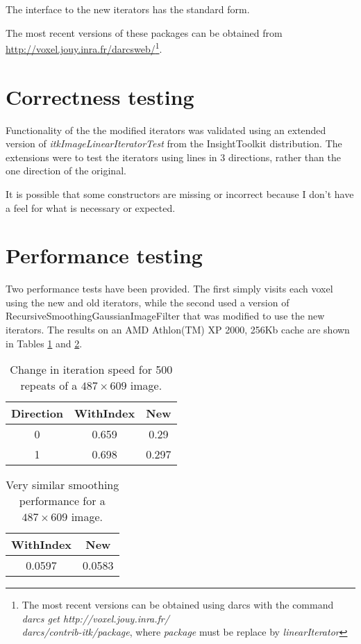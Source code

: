 \documentclass{InsightArticle}
\begin{document}
The interface to the new iterators has the standard form.

The most recent versions of these packages can be
obtained from \url{http://voxel.jouy.inra.fr/darcsweb/}\footnote{
The most recent versions can be obtained using darcs \cite{DarcsWebSite}
with the command {\em darcs get http://voxel.jouy.inra.fr/\\darcs/contrib-itk/package},
where {\em package} must be replace by {\em linearIterator}}.

\section{Correctness testing}
Functionality of the the modified iterators was validated using an
extended version of {\em itkImageLinearIteratorTest} from the
InsightToolkit distribution. The extensions were to test the iterators
using lines in 3 directions, rather than the one direction of the
original.

It is possible that some constructors are missing or incorrect because
I don't have a feel for what is necessary or expected.

\section{Performance testing}
Two performance tests have been provided. The first simply visits each
voxel using the new and old iterators, while the second used a version
of RecursiveSmoothingGaussianImageFilter that was modified to use the
new iterators. The results on an AMD Athlon(TM) XP 2000, 256Kb cache are shown in Tables \ref{tab:iterationPerf} and \ref{tab:smoothingPerf}.

\begin{table}[htbp]
\centering
\begin{tabular}{ccc}
\hline
Direction  &  WithIndex &  New \\
\hline
0   &    0.659  & 0.29 \\
1   &    0.698  & 0.297 \\
\hline
\end{tabular}
\caption{Change in iteration speed for 500 repeats of a $487 \times 609$ image. \label{tab:iterationPerf}}
\end{table}

\begin{table}[htbp]
\centering
\begin{tabular}{cc}
\hline
WithIndex &  New \\
\hline
0.0597 & 0.0583 \\
\hline
\end{tabular}
\caption{Very similar smoothing performance for a $487 \times 609$ image. \label{tab:smoothingPerf}}
\end{table}
\end{document}
